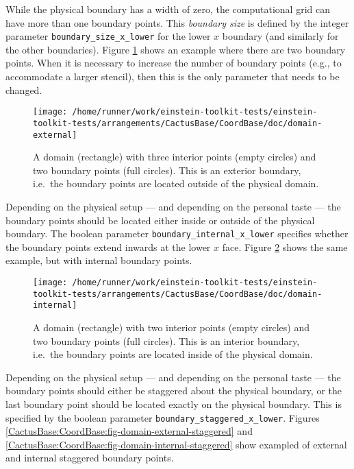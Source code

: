 While the physical boundary has a width of zero, the computational
grid can have more than one boundary points.  This {\emph{boundary
size}} is defined by the integer parameter
{\texttt{boundary\_size\_x\_lower}} for the lower $x$ boundary (and
similarly for the other boundaries).  Figure
{\ref{CactusBase:CoordBase:fig-domain-external}} shows an example
where there are two boundary points.  When it is necessary to increase
the number of boundary points (e.g., to accommodate a larger stencil),
then this is the only parameter that needs to be changed.

\begin{figure}
\begin{center}
\texttt{[image: /home/runner/work/einstein-toolkit-tests/einstein-toolkit-tests/arrangements/CactusBase/CoordBase/doc/domain-external]}
\end{center}
\caption{A domain (rectangle) with three interior points (empty
circles) and two boundary points (full circles).  This is an exterior
boundary, i.e.\ the boundary points are located outside of the
physical domain.}
\label{CactusBase:CoordBase:fig-domain-external}
\end{figure}

Depending on the physical setup --- and depending on the personal
taste --- the boundary points should be located either inside or
outside of the physical boundary.  The boolean parameter
{\texttt{boundary\_internal\_x\_lower}} specifies whether the boundary
points extend inwards at the lower $x$ face.  Figure
{\ref{CactusBase:CoordBase:fig-domain-internal}} shows the same
example, but with internal boundary points.

\begin{figure}
\begin{center}
\texttt{[image: /home/runner/work/einstein-toolkit-tests/einstein-toolkit-tests/arrangements/CactusBase/CoordBase/doc/domain-internal]}
\end{center}
\caption{A domain (rectangle) with two interior points (empty circles)
and two boundary points (full circles).  This is an interior boundary,
i.e.\ the boundary points are located inside of the physical domain.}
\label{CactusBase:CoordBase:fig-domain-internal}
\end{figure}

Depending on the physical setup --- and depending on the personal
taste --- the boundary points should either be staggered about the
physical boundary, or the last boundary point should be located
exactly on the physical boundary.  This is specified by the boolean
parameter {\texttt{boundary\_staggered\_x\_lower}}.  Figures
{\ref{CactusBase:CoordBase:fig-domain-external-staggered}} and
{\ref{CactusBase:CoordBase:fig-domain-internal-staggered}} show
exampled of external and internal staggered boundary points.


